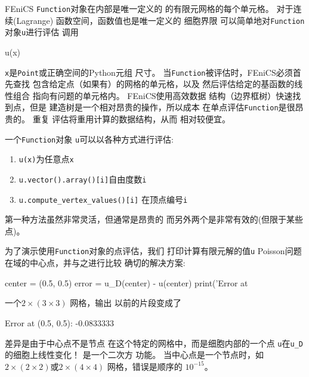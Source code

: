 
FEniCS \texttt{Function}对象在内部是唯一定义的
的有限元网格的每个单元格。 对于连续(Lagrange)
函数空间，函数值也是唯一定义的
细胞界限 可以简单地对\texttt{Function}对象\texttt{u}进行评估
调用

\begin{python}
u(x)
\end{python}
\texttt{x}是\texttt{Point}或正确空间的Python元组
尺寸。 当\texttt{Function}被评估时，FEniCS必须首先查找
包含给定点（如果有）的网格的单元格，以及
然后评估给定的基函数的线性组合
指向有问题的单元格内。 FEniCS使用高效数据
结构（边界框树）快速找到点，但是
建造树是一个相对昂贵的操作，所以成本
在单点评估\texttt{Function}是很昂贵的。 重复
评估将重用计算的数据结构，从而
相对较便宜。

\begin{notice}[廉价vs昂贵的功能评估]
一个\texttt{Function}对象
\texttt{u}可以以各种方式进行评估:

\begin{enumerate}
\item \texttt{u(x)}为任意点\texttt{x}

\item \texttt{u.vector().array()[i]}自由度数\texttt{i}

\item \verb!u.compute_vertex_values()[i]! 在顶点编号\texttt{i}
\end{enumerate}

\noindent
第一种方法虽然非常灵活，但通常是昂贵的
而另外两个是非常有效的(但限于某些点)。
\end{notice} 

为了演示使用\texttt{Function}对象的点评估，我们
打印计算有限元解的值\texttt{u}
Poisson问题在域的中心点，并与之进行比较
确切的解决方案:

\begin{python}
center = (0.5, 0.5)
error = u_D(center) - u(center)
print('Error at %
\end{python}
一个$2\times(3\times 3)$
网格，输出
以前的片段变成了

\begin{python}
Error at (0.5, 0.5): -0.0833333
\end{python}
差异是由于中心点不是节点
在这个特定的网格中，而是细胞内部的一个点
\texttt{u}在\verb!u_D!的细胞上线性变化！ 是一个二次方
功能。 当中心点是一个节点时，如$2\times(2\times
2)$或$2\times(4\times 4)$
网格，错误是顺序的
$10 ^{ - 15}$。

